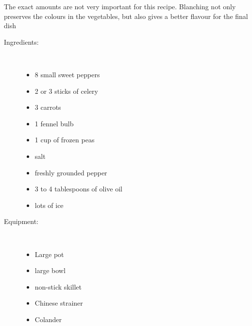 \documentclass[11pt,letterpaper]{article}
\begin{document}


The exact amounts are not very important for this recipe. Blanching not only preserves the colours in the vegetables, but also gives a better flavour for the final dish

\begin{description}

\item[Ingredients:]\ \\
	\begin{itemize}
	\item 8 small sweet peppers
	\item 2 or 3 sticks of celery
	\item 3 carrots
	\item 1 fennel bulb
	\item 1 cup of frozen peas
	\item salt
	\item freshly grounded pepper
	\item 3 to 4 tablespoons  of olive oil
	\item lots of ice
	\end{itemize}

\item[Equipment:]\ \\
	\begin{itemize}
	\item Large pot
	\item large bowl
	\item non-stick skillet
	\item Chinese strainer
	\item Colander
	\end{itemize}


\end{description}
\end{document}
